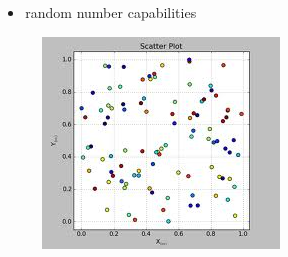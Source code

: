 \documentclass[compress=true]{beamer}
\begin{document}
\begin{frame}
\begin{columns}
\begin{column}{0.5\textwidth}
\begin{figure}
			\end{figure}
		\end{column}
		\begin{column}{0.5\textwidth}
			\begin{itemize}
				\item random number capabilities
			\end{itemize}
			\begin{figure}
				\includegraphics[height=0.3\textheight]{random.png}
			\end{figure}
		\end{column}
	\end{columns}
\end{frame}
\end{document}
